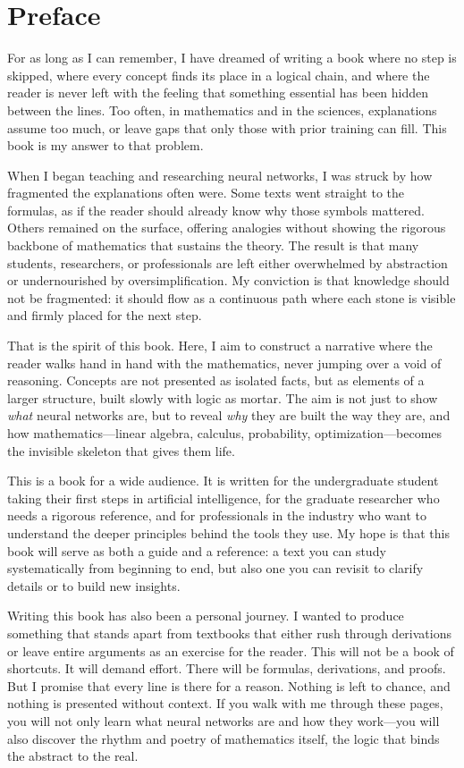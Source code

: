 \chapter*{Preface}

For as long as I can remember, I have dreamed of writing a book where no step is skipped, where every concept finds its place in a logical chain, and where the reader is never left with the feeling that something essential has been hidden between the lines. Too often, in mathematics and in the sciences, explanations assume too much, or leave gaps that only those with prior training can fill. This book is my answer to that problem.

When I began teaching and researching neural networks, I was struck by how fragmented the explanations often were. Some texts went straight to the formulas, as if the reader should already know why those symbols mattered. Others remained on the surface, offering analogies without showing the rigorous backbone of mathematics that sustains the theory. The result is that many students, researchers, or professionals are left either overwhelmed by abstraction or undernourished by oversimplification. My conviction is that knowledge should not be fragmented: it should flow as a continuous path where each stone is visible and firmly placed for the next step.

That is the spirit of this book. Here, I aim to construct a narrative where the reader walks hand in hand with the mathematics, never jumping over a void of reasoning. Concepts are not presented as isolated facts, but as elements of a larger structure, built slowly with logic as mortar. The aim is not just to show \emph{what} neural networks are, but to reveal \emph{why} they are built the way they are, and how mathematics---linear algebra, calculus, probability, optimization---becomes the invisible skeleton that gives them life.

This is a book for a wide audience. It is written for the undergraduate student taking their first steps in artificial intelligence, for the graduate researcher who needs a rigorous reference, and for professionals in the industry who want to understand the deeper principles behind the tools they use. My hope is that this book will serve as both a guide and a reference: a text you can study systematically from beginning to end, but also one you can revisit to clarify details or to build new insights.

Writing this book has also been a personal journey. I wanted to produce something that stands apart from textbooks that either rush through derivations or leave entire arguments as an exercise for the reader. This will not be a book of shortcuts. It will demand effort. There will be formulas, derivations, and proofs. But I promise that every line is there for a reason. Nothing is left to chance, and nothing is presented without context. If you walk with me through these pages, you will not only learn what neural networks are and how they work---you will also discover the rhythm and poetry of mathematics itself, the logic that binds the abstract to the real.

